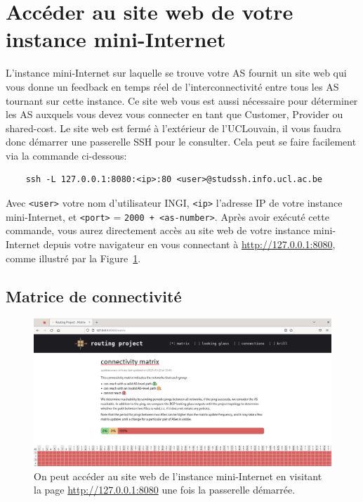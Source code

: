 \documentclass[a4paper, 11pt]{article}
\begin{document}
\section{Accéder au site web de votre instance mini-Internet}

L'instance mini-Internet sur laquelle se trouve votre AS fournit un site
web qui vous donne un feedback en temps réel de l'interconnectivité
entre tous les AS tournant sur cette instance. Ce site web vous est aussi
nécessaire pour déterminer les AS auxquels vous devez vous connecter
en tant que Customer, Provider ou shared-cost. Le site web est fermé
à l'extérieur de l'UCLouvain, il vous faudra donc démarrer une passerelle
SSH pour le consulter. Cela peut se faire facilement via la commande
ci-dessous:

\begin{verbatim}
    ssh -L 127.0.0.1:8080:<ip>:80 <user>@studssh.info.ucl.ac.be
\end{verbatim}
Avec \texttt{<user>} votre nom d'utilisateur INGI, \texttt{<ip>} l'adresse IP
de votre instance mini-Internet, et \texttt{<port>} = \texttt{2000 + <as-number>}.
Après avoir exécuté cette commande, vous aurez directement accès au site web
de votre instance mini-Internet depuis votre navigateur en vous connectant
à \url{http://127.0.0.1:8080}, comme illustré par la
Figure~\ref{fig:website-screenshot}.

\subsection{Matrice de connectivité}

\begin{figure}
    \centering
    \includegraphics[width=0.8\linewidth]{figures/website-screenshot.png}
    \caption{On peut accéder au site web de l'instance mini-Internet
            en visitant la page \url{http://127.0.0.1:8080}
            une fois la passerelle démarrée.}
    \label{fig:website-screenshot}
\end{figure}
\end{document}
